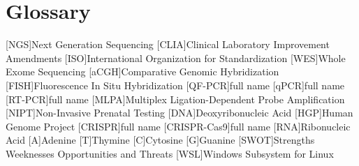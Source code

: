 \chapter{Glossary}

\footnotesize
\SingleSpacing

\begin{multicols}{2}
\begin{acronym}[AAAAAA]

	[NGS]{Next Generation Sequencing}
	[CLIA]{Clinical Laboratory Improvement Amendments}
	[ISO]{International Organization for Standardization}
	[WES]{Whole Exome Sequencing}
	[aCGH]{Comparative Genomic Hybridization}
	[FISH]{Fluorescence In Situ Hybridization}
	[QF-PCR]{full name}
	[qPCR]{full name}
	[RT-PCR]{full name}
	[MLPA]{Multiplex Ligation-Dependent Probe Amplification}
	[NIPT]{Non-Invasive Prenatal Testing}
	[DNA]{Deoxyribonucleic Acid}
	[HGP]{Human Genome Project}
	[CRISPR]{full name}
	[CRISPR-Cas9]{full name}
	[RNA]{Ribonucleic Acid}
	{Adenine}
	{Thymine}
	{Cytosine}
	{Guanine}
	[SWOT]{Strengths Weeknesses Opportunities and Threats}
	[WSL]{Windows Subsystem for Linux}


\end{acronym}
\end{multicols}

